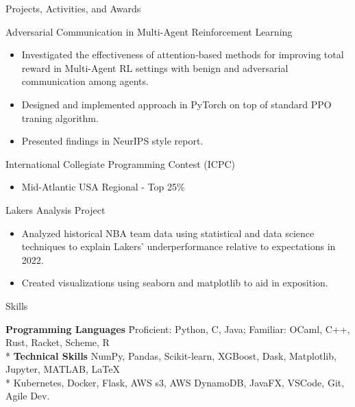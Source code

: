 \documentclass{article}
\newlength{\tabin}
\newlength{\secsep}
\newcommand{\lineunder}{\vspace*{-8pt} \\ \hspace*{-6pt} \hrulefill \\ \vspace*{-15pt}}
\newenvironment{tabbedsection}[1]{
  \begin{list}{}{
      \setlength{\itemsep}{0pt}
      \setlength{\labelsep}{0pt}
      \setlength{\labelwidth}{0pt}
      \setlength{\leftmargin}{\tabin}
      \setlength{\rightmargin}{\tabin}
      \setlength{\listparindent}{0pt}
      \setlength{\parsep}{0pt}
      \setlength{\parskip}{0pt}
      \setlength{\partopsep}{0pt}
      \setlength{\topsep}{#1}
    }
  \item[]
}{\end{list}}
\newenvironment{nospacetabbing}{
    \begin{tabbing}
}{\end{tabbing}\vspace{-1.2em}}
\newenvironment{resume_section}[1]{
  \filbreak
  \vspace{2\secsep}
  \textsc{\large#1}
  \lineunder
  \begin{tabbedsection}{\secsep}
}{\end{tabbedsection}}
\newenvironment{resume_subsection}[2][]{
  \textbf{#2} \hfill {\footnotesize #1} \hspace{-4em}
  \begin{tabbedsection}{0.5\secsep}
}{\end{tabbedsection}}
\newenvironment{subitems}{
  \renewcommand{\labelitemi}{-}
  \begin{itemize}
      \setlength{\labelsep}{1em}
}{\end{itemize}}
\begin{document}
\begin{resume_section}{Projects, Activities, and Awards}
  
  \begin{resume_subsection}{Adversarial Communication in Multi-Agent Reinforcement Learning}
    \begin{subitems}
      \item Investigated the effectiveness of attention-based methods for improving total reward
      in Multi-Agent RL settings with benign and adversarial communication among agents.
      \item Designed and implemented approach in PyTorch on top of standard PPO traning algorithm. 
      \item Presented findings in NeurIPS style report.
    \end{subitems}
  \end{resume_subsection}

 \begin{resume_subsection}[Feb. 2023]{International Collegiate Programming Contest (ICPC)}
   \begin{subitems}
     \item Mid-Atlantic USA Regional - Top 25\%
   \end{subitems}
 \end{resume_subsection}

 \begin{resume_subsection}[]{Lakers Analysis Project}
  \begin{subitems}
  	\item Analyzed historical NBA team data using statistical and data science techniques to explain Lakers' underperformance relative to expectations in 2022.
  	\item Created visualizations using seaborn and matplotlib to aid in exposition.
  \end{subitems}
  \end{resume_subsection}
  
\end{resume_section}

\begin{resume_section}{Skills}
  \begin{nospacetabbing}
  \textbf{Programming Languages} \= Proficient: Python, C, Java; Familiar: OCaml, C++, Rust, Racket, Scheme, R\\*
  \textbf{Technical Skills}  \> NumPy, Pandas, Scikit-learn, XGBoost, Dask, Matplotlib, Jupyter, MATLAB, \LaTeX \\ *
  \> Kubernetes, Docker, Flask, AWS s3, AWS DynamoDB, JavaFX, VSCode, Git, Agile Dev.

  \end{nospacetabbing}
\end{resume_section}
\end{document}
